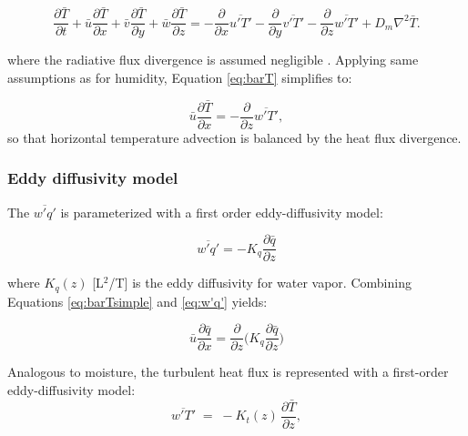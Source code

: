 \documentclass{article}
\begin{document}
    \begin{equation}
        \frac{\partial \bar T}{\partial t} + 
         \bar u \frac{\partial \bar T}{\partial x} + 
         \bar v \frac{\partial \bar T}{\partial y} + 
         \bar{w} \frac{\partial \bar T}{\partial z} = 
        -  \frac{\partial}{\partial x}  \overline {u'T'}
        -  \frac{\partial}{\partial y}  \overline {v'T'}
        -  \frac{\partial}{\partial z}  \overline {w'T'}
        + D_m \nabla^2 \bar{T} .
    \label{eq:barT}
    \end{equation}

    where the radiative flux divergence is assumed negligible \cite{brutsaert2013evaporation}. 
    Applying same assumptions as for humidity, Equation \ref{eq:barT} simplifies to:

    \begin{equation}
    \label{eq:barTsimple}
         \bar u \frac{\partial \bar T}{\partial x} = 
           -  \frac{\partial}{\partial z}  \overline {w'T'}, 
    \end{equation}
    so that horizontal temperature advection is balanced by the heat flux divergence.  

    
    \subsubsection{Eddy diffusivity model}

    The $\overline {w'q'}$ is parameterized with a first order eddy-diffusivity model: 

    \begin{equation}  
    \label{eq:w'q'}
      \overline {w'q'} = - K_q   \frac{\partial \bar q}{\partial z} 
    \end{equation} 

    where  $K_q(z)$ [L$^2$/T] is the eddy diffusivity for water vapor.  
    Combining Equations \ref{eq:barTsimple} and \ref{eq:w'q'} yields: 

    \begin{equation}  
      \bar u  \frac{\partial \bar q}{\partial x}  =  
        \frac{\partial}{\partial z} \bigg(  K_q   \frac{\partial \bar q}{\partial z} \bigg)
        \label{eq:sutton_q}
    \end{equation}

    Analogous to moisture, the turbulent heat flux is represented with a first-order eddy-diffusivity model: 
    \begin{equation}
    \overline{w'T'} \;=\; -K_t(z)\,\frac{\partial \bar T}{\partial z},
    \end{equation}
\end{document}
